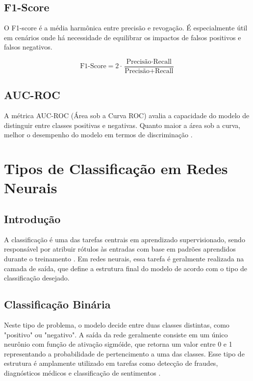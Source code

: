 \subsection{F1-Score}

O F1-score é a média harmônica entre precisão e revogação. É especialmente útil em cenários onde há necessidade de equilibrar os impactos de falsos positivos e falsos negativos.

\begin{equation}
\text{F1-Score} = 2 \cdot \frac{\text{Precisão} \cdot \text{Recall}}{\text{Precisão} + \text{Recall}}
\end{equation}

\subsection{AUC-ROC}

A métrica AUC-ROC (Área sob a Curva ROC) avalia a capacidade do modelo de distinguir entre classes positivas e negativas. Quanto maior a área sob a curva, melhor o desempenho do modelo em termos de discriminação \cite{rodrigues2024avaliaccao}.

\section{Tipos de Classificação em Redes Neurais}

\subsection{Introdução}
A classificação é uma das tarefas centrais em aprendizado supervisionado, sendo responsável por atribuir rótulos às entradas com base em padrões aprendidos durante o treinamento . Em redes neurais, essa tarefa é geralmente realizada na camada de saída, que define a estrutura final do modelo de acordo com o tipo de classificação desejado.

\subsection{Classificação Binária}

Neste tipo de problema, o modelo decide entre duas classes distintas, como "positivo" ou "negativo". A saída da rede geralmente consiste em um único neurônio com função de ativação sigmóide, que retorna um valor entre 0 e 1 representando a probabilidade de pertencimento a uma das classes. Esse tipo de estrutura é amplamente utilizado em tarefas como detecção de fraudes, diagnósticos médicos e classificação de sentimentos . 

